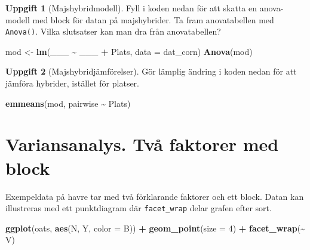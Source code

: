 \documentclass[
]{book}
\newenvironment{Shaded}{\begin{snugshade}}{\end{snugshade}}
\newcommand{\AttributeTok}[1]{\textcolor[rgb]{0.13,0.29,0.53}{#1}}
\newcommand{\DecValTok}[1]{\textcolor[rgb]{0.00,0.00,0.81}{#1}}
\newcommand{\FunctionTok}[1]{\textcolor[rgb]{0.13,0.29,0.53}{\textbf{#1}}}
\newcommand{\NormalTok}[1]{#1}
\newcommand{\OtherTok}[1]{\textcolor[rgb]{0.56,0.35,0.01}{#1}}
\newcommand{\SpecialCharTok}[1]{\textcolor[rgb]{0.81,0.36,0.00}{\textbf{#1}}}
\theoremstyle{definition}
\theoremstyle{definition}
\theoremstyle{definition}
\newtheorem{exercise}{Uppgift}[chapter]
\theoremstyle{definition}
\theoremstyle{remark}
\begin{document}
\begin{exercise}[Majshybridmodell]

Fyll i koden nedan för att skatta en anova-modell med block för datan på majshybrider. Ta fram anovatabellen med \texttt{Anova()}. Vilka slutsatser kan man dra från anovatabellen?

\begin{Shaded}
\begin{Highlighting}[]
\NormalTok{mod }\OtherTok{\textless{}{-}} \FunctionTok{lm}\NormalTok{(\_\_\_ }\SpecialCharTok{\textasciitilde{}}\NormalTok{ \_\_\_ }\SpecialCharTok{+}\NormalTok{ Plats, }\AttributeTok{data =}\NormalTok{ dat\_corn)}
\FunctionTok{Anova}\NormalTok{(mod)}
\end{Highlighting}
\end{Shaded}

\end{exercise}

\begin{exercise}[Majshybridjämförelser]

Gör lämplig ändring i koden nedan för att jämföra hybrider, istället för platser.

\begin{Shaded}
\begin{Highlighting}[]
\FunctionTok{emmeans}\NormalTok{(mod, pairwise }\SpecialCharTok{\textasciitilde{}}\NormalTok{ Plats)}
\end{Highlighting}
\end{Shaded}

\end{exercise}

\section{Variansanalys. Två faktorer med block}\label{variansanalys.-tvuxe5-faktorer-med-block}

Exempeldata på havre tar med två förklarande faktorer och ett block. Datan kan illustreras med ett punktdiagram där \texttt{facet\_wrap} delar grafen efter sort.

\begin{Shaded}
\begin{Highlighting}[]
\FunctionTok{ggplot}\NormalTok{(oats, }\FunctionTok{aes}\NormalTok{(N, Y, }\AttributeTok{color =}\NormalTok{ B)) }\SpecialCharTok{+}
  \FunctionTok{geom\_point}\NormalTok{(}\AttributeTok{size =} \DecValTok{4}\NormalTok{) }\SpecialCharTok{+}
  \FunctionTok{facet\_wrap}\NormalTok{(}\SpecialCharTok{\textasciitilde{}}\NormalTok{ V)}
\end{Highlighting}
\end{Shaded}
\end{document}
